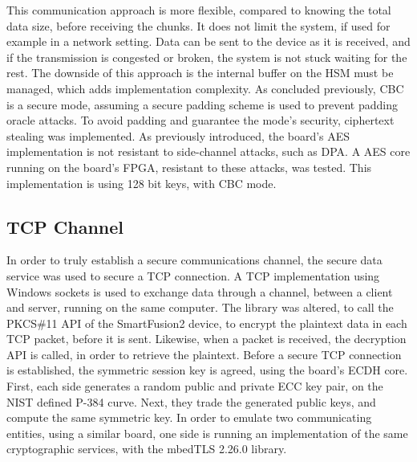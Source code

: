 This communication approach is more flexible, compared to knowing the total data size, before receiving the chunks. It does not limit the system, if used for example in a network setting. Data can be sent to the device as it is received, and if the transmission is congested or broken, the system is not stuck waiting for the rest. The downside of this approach is the internal buffer on the HSM must be managed, which adds implementation complexity.
As concluded previously, CBC is a secure mode, assuming a secure padding scheme is used to prevent padding oracle attacks. To avoid padding and guarantee the mode's security, ciphertext stealing was implemented.
As previously introduced, the board's AES implementation is not resistant to side-channel attacks, such as DPA. A AES core running on the board's FPGA, resistant to these attacks, was tested. This implementation is using 128 bit keys, with CBC mode.

\subsection{TCP Channel}\label{chap:implementation:services:secure:tcp}

In order to truly establish a secure communications channel, the secure data service was used to secure a TCP connection. A TCP implementation using Windows sockets is used to exchange data through a channel, between a client and server, running on the same computer. The library was altered, to call the PKCS\#11 API of the SmartFusion2 device, to encrypt the plaintext data in each TCP packet, before it is sent. Likewise, when a packet is received, the decryption API is called, in order to retrieve the plaintext.
Before a secure TCP connection is established, the symmetric session key is agreed, using the board's ECDH core. First, each side generates a random public and private ECC key pair, on the NIST defined P-384 curve. Next, they trade the generated public keys, and compute the same symmetric key. In order to emulate two communicating entities, using a similar board, one side is running an implementation of the same cryptographic services, with the mbedTLS 2.26.0 library.



